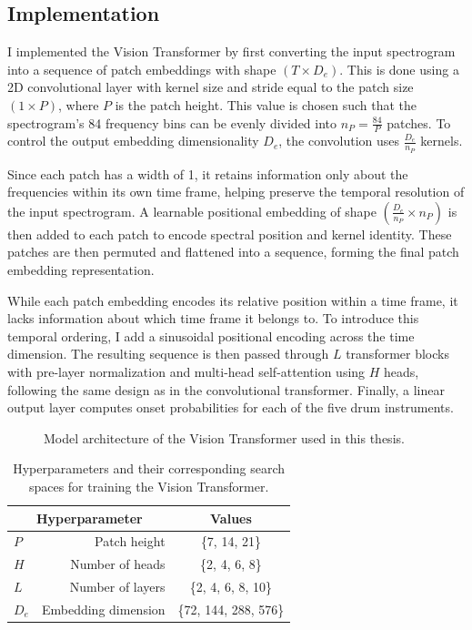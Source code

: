 \subsection{Implementation}

I implemented the Vision Transformer by first converting the input spectrogram into a sequence of patch embeddings with shape $(T \times D_e)$. This is done using a 2D convolutional layer with kernel size and stride equal to the patch size $(1 \times P)$, where $P$ is the patch height. This value is chosen such that the spectrogram's 84 frequency bins can be evenly divided into $n_P = \frac{84}{P}$ patches. To control the output embedding dimensionality $D_e$, the convolution uses $\frac{D_e}{n_P}$ kernels.

Since each patch has a width of 1, it retains information only about the frequencies within its own time frame, helping preserve the temporal resolution of the input spectrogram. A learnable positional embedding of shape $(\frac{D_e}{n_P} \times n_P)$ is then added to each patch to encode spectral position and kernel identity. These patches are then permuted and flattened into a sequence, forming the final patch embedding representation.

While each patch embedding encodes its relative position within a time frame, it lacks information about which time frame it belongs to. To introduce this temporal ordering, I add a sinusoidal positional encoding across the time dimension. The resulting sequence is then passed through $L$ transformer blocks with pre-layer normalization and multi-head self-attention using $H$ heads, following the same design as in the convolutional transformer. Finally, a linear output layer computes onset probabilities for each of the five drum instruments.

\begin{figure}[H]
    \hspace*{-0.5cm}
    \centering
    
    \caption{Model architecture of the Vision Transformer used in this thesis.}
    \label{ViTFigure}
\end{figure}

\begin{table}[H]
    \centering
    \begin{tabular}{lr|c}
        \multicolumn{2}{c|}{Hyperparameter} & Values       \\
        \hline
        $P$ & Patch height      & \{7, 14, 21\} \\
        $H$ & Number of heads     & \{2, 4, 6, 8\} \\
        $L$ & Number of layers      & \{2, 4, 6, 8, 10\} \\
        $D_e$ & Embedding dimension      & \{72, 144, 288, 576\} \\
    \end{tabular}
    \caption{Hyperparameters and their corresponding search spaces for training the Vision Transformer.}
    \label{ViTHyperparams}
\end{table}